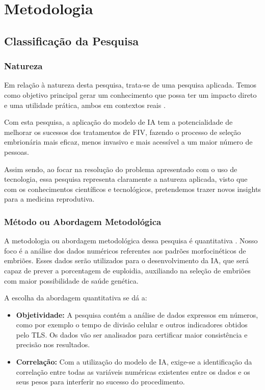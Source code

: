 \chapter[Metodologia]{Metodologia}

\section{Classificação da Pesquisa}

\subsection{Natureza}

Em relação à natureza desta pesquisa, trata-se de uma pesquisa aplicada. Temos como objetivo principal gerar um conhecimento que possa ter um impacto direto e uma utilidade prática, ambos em contextos reais \cite{nascimento2016}. 

Com esta pesquisa, a aplicação do modelo de IA tem a potencialidade de melhorar os sucessos dos tratamentos de FIV, fazendo o processo de seleção embrionária mais eficaz, menos invasivo e mais acessível a um maior número de pessoas.

Assim sendo, ao focar na resolução do problema apresentado com o uso de tecnologia, essa pesquisa representa claramente a natureza aplicada, visto que com os conhecimentos científicos e tecnológicos, pretendemos trazer novos insights para a medicina reprodutiva. 

\subsection{Método ou Abordagem Metodológica}

A metodologia ou abordagem metodológica dessa pesquisa é quantitativa \cite{nascimento2016}. Nosso foco é a análise dos dados numéricos referentes aos padrões morfocinéticos de embriões. Esses dados serão utilizados para o desenvolvimento da IA, que será capaz de prever a porcentagem de euploidia, auxiliando na seleção de embriões com maior possibilidade de saúde genética.

A escolha da abordagem quantitativa se dá a: 

\begin{itemize}
  \item \textbf{Objetividade:} A pesquisa contém a análise de dados expressos em números, como por exemplo o tempo de divisão celular e outros indicadores obtidos pelo TLS. Os dados vão ser analisados para certificar maior consistência e precisão nos resultados.
  \item \textbf{Correlação:} Com a utilização do modelo de IA, exige-se a identificação da correlação entre todas as variáveis numéricas existentes entre os dados e os seus pesos para interferir no sucesso do procedimento. 
\end{itemize}

